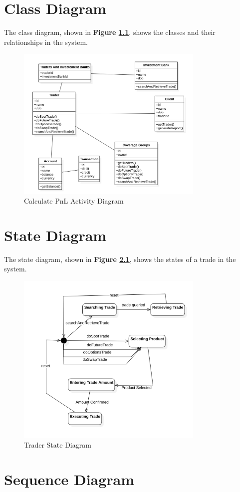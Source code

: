 \documentclass[a4paper]{report}
\begin{document}
\chapter{Class Diagram}

The class diagram, shown in \textbf{Figure \ref{fig:analysis-class-diagram}}, shows the classes and their relationships in the system.

\begin{figure}[h!]
    \centering
    \includegraphics[width=0.8\textwidth]{images/analysis-class-diagram.png}
    \caption{Calculate PnL Activity Diagram}
    \label{fig:analysis-class-diagram}
\end{figure}

\chapter{State Diagram}

The state diagram, shown in \textbf{Figure \ref{fig:trade-state-diagram}}, shows the states of a trade in the system.

\begin{figure}[h!]
    \centering
    \includegraphics[width=0.8\textwidth]{images/state-diagram-trader.png}
    \caption{Trader State Diagram}
    \label{fig:trade-state-diagram}
\end{figure}

\chapter{Sequence Diagram}
\end{document}
